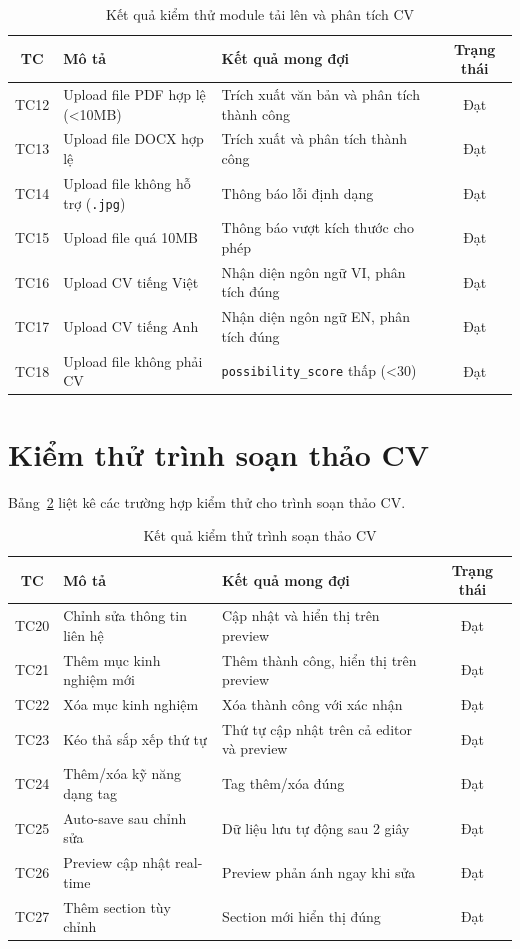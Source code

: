 \documentclass[../DoAn.tex]{subfiles}
\begin{document}
\begin{table}[H]
\centering
\caption{Kết quả kiểm thử module tải lên và phân tích CV}
\label{tab:test-upload}
\begin{tabular}{|c|p{5cm}|p{5cm}|c|}
\hline
\textbf{TC} & \textbf{Mô tả} & \textbf{Kết quả mong đợi} & \textbf{Trạng thái} \\
\hline
TC12 & Upload file PDF hợp lệ (<10MB) & Trích xuất văn bản và phân tích thành công & Đạt \\
\hline
TC13 & Upload file DOCX hợp lệ & Trích xuất và phân tích thành công & Đạt \\
\hline
TC14 & Upload file không hỗ trợ (\texttt{.jpg}) & Thông báo lỗi định dạng & Đạt \\
\hline
TC15 & Upload file quá 10MB & Thông báo vượt kích thước cho phép & Đạt \\
\hline
TC16 & Upload CV tiếng Việt & Nhận diện ngôn ngữ VI, phân tích đúng & Đạt \\
\hline
TC17 & Upload CV tiếng Anh & Nhận diện ngôn ngữ EN, phân tích đúng & Đạt \\
\hline
TC18 & Upload file không phải CV & \texttt{possibility\_score} thấp (<30) & Đạt \\
\hline
\end{tabular}
\end{table}

\section{Kiểm thử trình soạn thảo CV}

Bảng~\ref{tab:test-editor} liệt kê các trường hợp kiểm thử cho trình soạn thảo CV.

\begin{table}[H]
\centering
\caption{Kết quả kiểm thử trình soạn thảo CV}
\label{tab:test-editor}
\begin{tabular}{|c|p{5cm}|p{5cm}|c|}
\hline
\textbf{TC} & \textbf{Mô tả} & \textbf{Kết quả mong đợi} & \textbf{Trạng thái} \\
\hline
TC20 & Chỉnh sửa thông tin liên hệ & Cập nhật và hiển thị trên preview & Đạt \\
\hline
TC21 & Thêm mục kinh nghiệm mới & Thêm thành công, hiển thị trên preview & Đạt \\
\hline
TC22 & Xóa mục kinh nghiệm & Xóa thành công với xác nhận & Đạt \\
\hline
TC23 & Kéo thả sắp xếp thứ tự & Thứ tự cập nhật trên cả editor và preview & Đạt \\
\hline
TC24 & Thêm/xóa kỹ năng dạng tag & Tag thêm/xóa đúng & Đạt \\
\hline
TC25 & Auto-save sau chỉnh sửa & Dữ liệu lưu tự động sau 2 giây & Đạt \\
\hline
TC26 & Preview cập nhật real-time & Preview phản ánh ngay khi sửa & Đạt \\
\hline
TC27 & Thêm section tùy chỉnh & Section mới hiển thị đúng & Đạt \\
\hline
\end{tabular}
\end{table}
\end{document}
